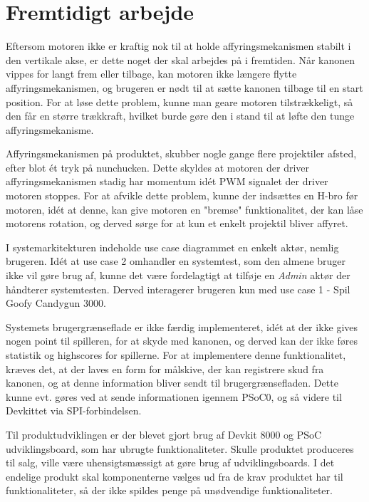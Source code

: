 \chapter{Fremtidigt arbejde}

Eftersom motoren ikke er kraftig nok til at holde affyringsmekanismen stabilt i den vertikale akse, er dette noget der skal arbejdes på i fremtiden. Når kanonen vippes for langt frem eller tilbage, kan motoren ikke længere flytte affyringsmekanismen, og brugeren er nødt til at sætte kanonen tilbage til en start position. For at løse dette problem, kunne man geare motoren tilstrækkeligt, så den får en større trækkraft, hvilket burde gøre den i stand til at løfte den tunge affyringsmekanisme. \newline

\noindent Affyringsmekanismen på produktet, skubber nogle gange flere projektiler afsted, efter blot ét tryk på nunchucken. Dette skyldes at motoren der driver affyringsmekanismen stadig har momentum idét PWM signalet der driver motoren stoppes. For at afvikle dette problem, kunne der indsættes en H-bro før motoren, idét at denne, kan give motoren en "bremse" funktionalitet, der kan låse motorens rotation, og derved sørge for at kun et enkelt projektil bliver affyret. \newline 

\noindent I systemarkitekturen indeholde use case diagrammet en enkelt aktør, nemlig brugeren. Idét at use case 2 omhandler en systemtest, som den almene bruger ikke vil gøre brug af, kunne det være fordelagtigt at tilføje en \textit{Admin} aktør der håndterer systemtesten. Derved interagerer brugeren kun med use case 1 - Spil Goofy Candygun 3000. \newline

\noindent Systemets brugergrænseflade er ikke færdig implementeret, idét at der ikke gives nogen point til spilleren, for at skyde med kanonen, og derved kan der ikke føres statistik og highscores for spillerne. For at implementere denne funktionalitet, kræves det, at der laves en form for målskive, der kan registrere skud fra kanonen, og at denne information bliver sendt til brugergrænsefladen. Dette kunne evt. gøres ved at sende informationen igennem PSoC0, og så videre til Devkittet via SPI-forbindelsen. \newline

\noindent Til produktudviklingen er der blevet gjort brug af Devkit 8000 og PSoC udviklingsboard, som har ubrugte funktionaliteter. Skulle produktet produceres til salg, ville være uhensigtsmæssigt at gøre brug af udviklingsboards. I det endelige produkt skal komponenterne vælges ud fra de krav produktet har til funktionaliteter, så der ikke spildes penge på unødvendige funktionaliteter.